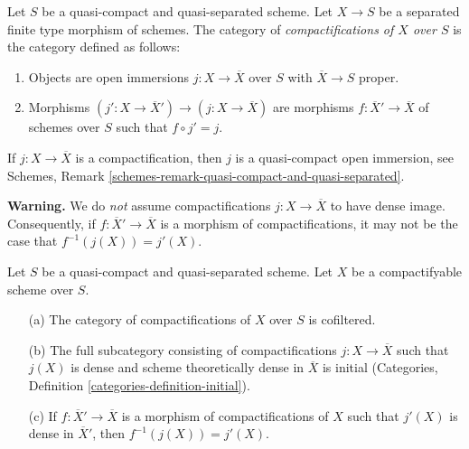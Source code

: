 \medskip\noindent
Let $S$ be a quasi-compact and quasi-separated scheme.
Let $X \to S$ be a separated finite type morphism of schemes. The category
of {\it compactifications of $X$ over $S$} is the category defined
as follows:
\begin{enumerate}
\item Objects are open immersions $j : X \to \overline{X}$ over $S$ with
$\overline{X} \to S$ proper.
\item Morphisms $(j' : X \to \overline{X}') \to (j : X \to \overline{X})$
are morphisms $f : \overline{X}' \to \overline{X}$ of schemes over $S$
such that $f \circ j' = j$.
\end{enumerate}
If $j : X \to \overline{X}$ is a compactification, then $j$ is a
quasi-compact open immersion, see
Schemes, Remark \ref{schemes-remark-quasi-compact-and-quasi-separated}.

\medskip\noindent
{\bf Warning.} We do {\it not} assume compactifications $j : X \to \overline{X}$
to have dense image. Consequently, if $f : \overline{X}' \to \overline{X}$
is a morphism of compactifications, it may not be the case that
$f^{-1}(j(X)) = j'(X)$.

\begin{lemma}
\label{lemma-compactifications-cofiltered}
Let $S$ be a quasi-compact and quasi-separated scheme.
Let $X$ be a compactifyable scheme over $S$.
\begin{enumerate}
\item[(a)] The category of compactifications of $X$ over $S$ is
cofiltered.
\item[(b)] The full subcategory consisting of compactifications
$j : X \to \overline{X}$ such that $j(X)$ is dense and
scheme theoretically dense in $\overline{X}$ is initial
(Categories, Definition \ref{categories-definition-initial}).
\item[(c)] If $f : \overline{X}' \to \overline{X}$ is a morphism
of compactifications of $X$ such that $j'(X)$ is dense in $\overline{X}'$,
then $f^{-1}(j(X)) = j'(X)$.
\end{enumerate}
\end{lemma}

